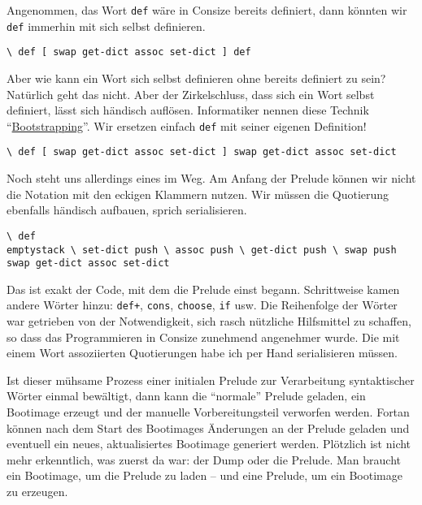 Angenommen, das Wort \verb|def| wäre in Consize bereits definiert, dann könnten wir \verb|def| immerhin mit sich selbst definieren.

\begin{verbatim}
\ def [ swap get-dict assoc set-dict ] def
\end{verbatim}

Aber wie kann ein Wort sich selbst definieren ohne bereits definiert zu sein? Natürlich geht das nicht. Aber der Zirkelschluss, dass sich ein Wort selbst definiert, lässt sich händisch auflösen. Informatiker nennen diese Technik "`\href{http://de.wikipedia.org/wiki/Bootstrapping\_(Informatik)}{Bootstrapping}"'. Wir ersetzen einfach \verb|def| mit seiner eigenen Definition!

\begin{verbatim}
\ def [ swap get-dict assoc set-dict ] swap get-dict assoc set-dict
\end{verbatim}

Noch steht uns allerdings eines im Weg. Am Anfang der Prelude können wir nicht die Notation mit den eckigen Klammern nutzen. Wir müssen die Quotierung ebenfalls händisch aufbauen, sprich serialisieren.

\begin{verbatim}
\ def
emptystack \ set-dict push \ assoc push \ get-dict push \ swap push
swap get-dict assoc set-dict
\end{verbatim}

Das ist exakt der Code, mit dem die Prelude einst begann. Schrittweise kamen andere Wörter hinzu: \verb|def+|, \verb|cons|, \verb|choose|, \verb|if| usw. Die Reihenfolge der Wörter war getrieben von der Notwendigkeit, sich rasch nützliche Hilfsmittel zu schaffen, so dass das Programmieren in Consize zunehmend angenehmer wurde. Die mit einem Wort assoziierten Quotierungen habe ich per Hand serialisieren müssen.

Ist dieser mühsame Prozess einer initialen Prelude zur Verarbeitung syntaktischer Wörter einmal bewältigt, dann kann die "`normale"' Prelude geladen, ein Bootimage erzeugt und der manuelle Vorbereitungsteil verworfen werden. Fortan können nach dem Start des Bootimages Änderungen an der Prelude geladen und eventuell ein neues, aktualisiertes Bootimage generiert werden. Plötzlich ist nicht mehr erkenntlich, was zuerst da war: der Dump oder die Prelude. Man braucht ein Bootimage, um die Prelude zu laden -- und eine Prelude, um ein Bootimage zu erzeugen.

